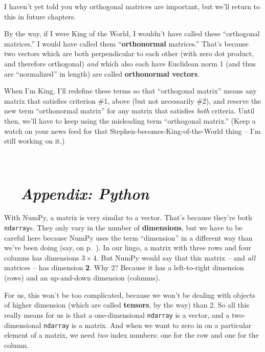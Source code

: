 
I haven't yet told you why orthogonal matrices are important, but we'll return
to this in future chapters.


By the way, if I were King of the World, I wouldn't have called these
``orthogonal matrices.'' I would have called them ``\textbf{orthonormal}
matrices.'' That's because two vectors which are both perpendicular to each
other (with zero dot product, and therefore orthogonal) \textit{and} which also
each have Euclidean norm 1 (and thus are ``normalized'' in length) are called
\textbf{orthonormal vectors}.

When I'm King, I'll redefine these terms so that ``orthogonal matrix'' means
any matrix that satisfies criterion \#1, above (but not necessarily \#2), and
reserve the new term ``orthonormal matrix'' for any matrix that satisfies
\textit{both} criteria. Until then, we'll have to keep using the misleading
term ``orthogonal matrix.'' (Keep a watch on your news feed for that
Stephen-becomes-King-of-the-World thing -- I'm still working on it.)

\vspace{.1in}
\hrulefill \\

\pagebreak

\section*{\faPython \ \ \textit{Appendix: Python}}



With NumPy, a matrix is very similar to a vector. That's because they're both
\texttt{ndarray}s. They only vary in the number of \textbf{dimensions}, but we
have to be careful here because NumPy uses the term ``dimension'' in a
different way than we've been doing (say, on p.~\pageref{dimension}). In our
lingo, a matrix with three rows and four columns has dimensions $3\times 4$.
But NumPy would say that this matrix -- and \textit{all} matrices -- has
dimension \textbf{2}. Why 2? Because it has a left-to-right dimension (rows)
and an up-and-down dimension (columns).


For us, this won't be too complicated, because we won't be dealing with objects
of higher dimension (which are called \textbf{tensors}, by the way) than 2. So
all this really means for us is that a one-dimensional \texttt{ndarray} is a
vector, and a two-dimensional \texttt{ndarray} is a matrix. And when we want to
zero in on a particular element of a matrix, we need \textit{two} index
numbers: one for the row and one for the column.

